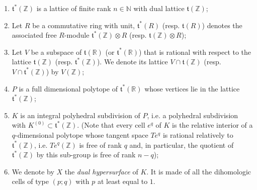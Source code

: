 \documentclass[AHL,Unicode,longabstracts,published]{cedram}
\newcommand{\R}{\mathbb{R}}
\newcommand{\Z}{\mathbb{Z}}
\newcommand{\N}{\mathbb{N}}
\renewcommand{\t}{\mathfrak{t}}
\begin{document}
\pagebreak
\begin{nota}\leavevmode
\begin{enumerate}
\item $\t^*(\Z)$ is a lattice of finite rank $n\in\N$ with dual lattice $\t(\Z)$;
\item Let $R$ be a commutative ring with unit, $\t^*(R)$ (resp. $\t(R)$) denotes the associated free $R$-module $\t^*(\Z)\otimes R$ (resp. $\t(\Z)\otimes R$);
\item Let $V$ be a subspace of $\t(\R)$ (or $\t^*(\R)$) that is rational with respect to the lattice $\t(\Z)$ (resp. $\t^*(\Z)$). We denote its lattice $V\cap\t(\Z)$ (resp. $V\cap\t^*(\Z)$) by $V(\Z)$;
\item $P$ is a full dimensional polytope of $\t^*(\R)$ whose vertices lie in the lattice $\t^*(\Z)$;
\item $K$ is an integral polyhedral subdivision of $P$, i.e. a polyhedral subdivision with $K^{(0)}\subset \t^*(\Z)$. (Note that every cell $e^q$ of $K$ is the relative interior of a $q$-dimensional polytope whose tangent space $Te^q$ is rational relatively to $\t^*(\Z)$, i.e. $Te^q(\Z)$ is free of rank $q$ and, in particular, the quotient of $\t^*(\Z)$ by this sub-group is free of rank $n-q$);
\item We denote by $X$ the \emph{dual hypersurface} of $K$. It is made of all the dihomologic cells of type $(p;q)$ with $p$ at least equal to $1$.
\end{enumerate}
\end{nota}
\end{document}

